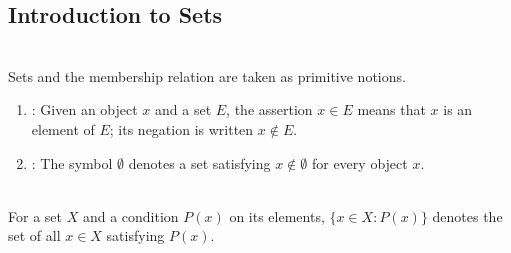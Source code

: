 \subsection{Introduction to Sets}

\begin{definition} \label{def:sets-and-membership} \\
Sets and the membership relation are taken as primitive notions.
\begin{enumerate}[label=(\roman*)]
\setlength{\itemsep}{0pt}
\item {}: Given an object $x$ and a set $E$, the assertion $x\in E$ means that $x$ is an element of $E$; its negation is written $x\notin E$.
\item {}: The symbol $\emptyset$ denotes a set satisfying $x\notin\emptyset$ for every object $x$.
\end{enumerate}
\end{definition}

\begin{definition} \label{def:set-builder-notation} \\
For a set $X$ and a condition $P(x)$ on its elements, $\{x\in X:P(x)\}$ denotes the set of all $x\in X$ satisfying $P(x)$.
\end{definition}
